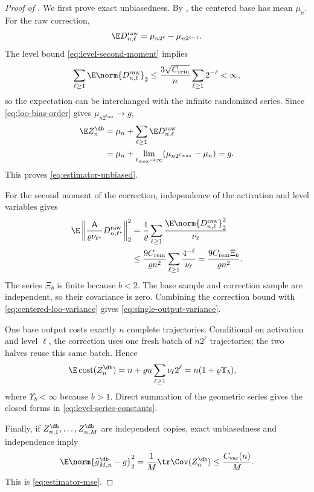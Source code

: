 \begin{proof}[Proof of ]
We first prove exact unbiasedness.  By , the centered base has mean $\mu_n$.  For the raw correction,
\begin{equation}\label{eq:delta-mean}
 \E D_{n,\ell}^{\rm raw}
 =\mu_{n2^\ell}-\mu_{n2^{\ell-1}}.
\end{equation}
The level bound \eqref{eq:level-second-moment} implies
\[
 \sum_{\ell\ge1}\E\norm{D_{n,\ell}^{\rm raw}}_2
 \le\frac{3\sqrt{C_{\rm rem}}}{n}\sum_{\ell\ge1}2^{-\ell}<\infty,
\]
so the expectation can be interchanged with the infinite randomized series.  Since \eqref{eq:loo-bias-order} gives $\mu_{n2^{\ell_{\max}}}\to g$,
\begin{align*}
 \E Z_n^{\db}
 &=\mu_n+\sum_{\ell\ge1}\E D_{n,\ell}^{\rm raw}\\
 &=\mu_n+\lim_{\ell_{\max}\to\infty}(\mu_{n2^{\ell_{\max}}}-\mu_n)
 =g.
\end{align*}
This proves \eqref{eq:estimator-unbiased}.

For the second moment of the correction, independence of the activation and level variables gives
\begin{align*}
 \E\left\|\frac{\mathsf A}{\varrho\nu_{\ell^\star}}D_{n,\ell^\star}^{\rm raw}\right\|_2^2
 &=\frac1\varrho\sum_{\ell\ge1}
 \frac{\E\norm{D_{n,\ell}^{\rm raw}}_2^2}{\nu_\ell}\\
 &\le\frac{9C_{\rm rem}}{\varrho n^2}
 \sum_{\ell\ge1}\frac{4^{-\ell}}{\nu_\ell}
 =\frac{9C_{\rm rem}\Xi_b}{\varrho n^2}.
\end{align*}
The series $\Xi_b$ is finite because $b<2$.  The base sample and correction sample are independent, so their covariance is zero.  Combining the correction bound with \eqref{eq:centered-loo-variance} gives \eqref{eq:single-output-variance}.

One base output costs exactly $n$ complete trajectories.  Conditional on activation and level $\ell$, the correction uses one fresh batch of $n2^\ell$ trajectories; the two halves reuse this same batch.  Hence
\begin{align*}
 \E\operatorname{cost}(Z_n^{\db})
 &=n+\varrho n\sum_{\ell\ge1}\nu_\ell2^\ell
 =n(1+\varrho \Upsilon_b),
\end{align*}
where $\Upsilon_b<\infty$ because $b>1$.  Direct summation of the geometric series gives the closed forms in \eqref{eq:level-series-constants}.

Finally, if $Z_{n,1}^{\db},\ldots,Z_{n,M}^{\db}$ are independent copies, exact unbiasedness and independence imply
\[
 \E\norm{\widehat g_{M,n}^{\db}-g}_2^2
 =\frac1M\tr\Cov(Z_n^{\db})
 \le\frac{C_{\rm var}(n)}{M}.
\]
This is \eqref{eq:estimator-mse}.
\end{proof}

